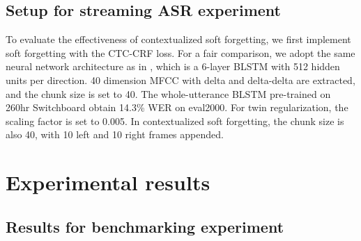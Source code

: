 \documentclass[a4paper]{article}
\begin{document}
\subsection{Setup for streaming ASR experiment}
To evaluate the effectiveness of contextualized soft forgetting, we first implement soft forgetting with the CTC-CRF loss. For a fair comparison, we adopt the same neural network architecture as in \cite{SForgetting}, which is a 6-layer BLSTM with 512 hidden units per direction. 40 dimension MFCC with delta and delta-delta are extracted, and the chunk size is set to 40. The whole-utterance BLSTM pre-trained on 260hr Switchboard obtain 14.3\% WER on eval2000. For twin regularization, the scaling factor  is set to 0.005. In contextualized soft forgetting, the chunk size is also 40, with 10 left and 10 right frames appended.

\section{Experimental results}
\subsection{Results for benchmarking experiment}

\begin{table}[th]
\vspace{-0.25cm}
	\centering
	\caption{Results over WSJ (80-h training data).}
		\vspace{-0.25cm}
\vspace{-0.25cm}
	\label{wsj}
\end{table}
\end{document}
